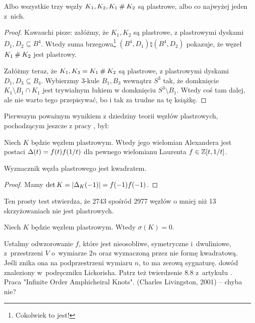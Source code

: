 \begin{proposition}
    Albo wszystkie trzy węzły $K_1, K_2, K_1 \mathbin{\#} K_2$ są plastrowe, albo co najwyżej jeden z~nich.
\end{proposition}

\begin{proof}
    Kawauchi \cite[s. 155]{kawauchi96} pisze: załóżmy, że $K_1, K_2$ są plastrowe, z plastrowymi dyskami $D_1, D_2 \subseteq B^4$.
    Wtedy suma brzegowa\footnote{Cokolwiek to jest!} $(B^4, D_1) \natural (B^4, D_2)$ pokazuje, że węzeł $K_1 \mathbin{\#} K_2$ jest plastrowy.

    Załóżmy teraz, że $K_1, K_3 = K_1 \mathbin{\#} K_2$ są plastrowe, z plastrowymi dyskami $D_1, D_3 \subseteq B_4$.
    Wybierzmy 3-kule $B_1, B_3$ wewnątrz $S^3$ tak, że domknięcie $K_1 \setminus B_1 \cap K_1$ jest trywialnym łukiem w domknięciu $S^3 \setminus B_1$.
    Wtedy coś tam dalej, ale nie warto tego przepisywać, bo i tak za trudne na tę książkę.
\end{proof}

Pierwszym poważnym wynikiem z dziedziny teorii węzłów plastrowych, pochodzącym jeszcze z pracy \cite{fox66}, był:

\begin{proposition}
%
    Niech $K$ będzie węzłem plastrowym.
    Wtedy jego wielomian Alexandera jest postaci $\Delta(t) = f(t) f(1/t)$ dla pewnego wielomianu Laurenta $f \in \mathbb Z[t, 1/t]$.
\end{proposition}

\begin{corollary}
    Wyznacznik węzła plastrowego jest kwadratem.
\end{corollary}

\begin{proof}
    Mamy $\det K = |\Delta_K(-1)| = f(-1) f(-1)$.
\end{proof}

Ten prosty test stwierdza, że 2743 spośród 2977 węzłów o mniej niż 13 skrzyżowaniach nie jest plastrowych.

\begin{proposition}
%
    Niech $K$ będzie węzłem plastrowym.
    Wtedy $\sigma(K) = 0$.
\end{proposition}

\begin{tobedone}
    Ustalmy odwzorowanie $f$, które jest nieosobliwe, symetryczne i~dwuliniowe, z~przestrzeni $V$ o~wymiarze $2n$ oraz wyznaczoną przez nie formę kwadratową.
    Jeśli znika ona na podprzestrzeni wymiaru $n$, to ma zerową sygnaturę.
    dowód znaleziony w~podręczniku Lickorisha.
    Patrz też twierdzenie 8.8 z~artykułu \cite{murasugi65}.
    Praca "Infinite Order Amphicheiral Knots". (Charles Livingston, 2001) -- chyba nie?
\end{tobedone}

